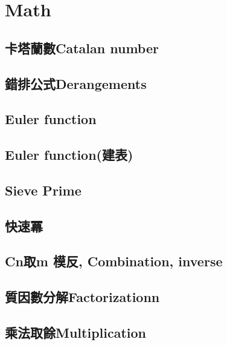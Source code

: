 \section{Math}

\subsection{卡塔蘭數Catalan number}


\subsection{錯排公式Derangements}


\subsection{Euler function}


\subsection{Euler function(建表)}


\subsection{Sieve Prime}


\subsection{快速冪}


\subsection{Cn取m 模反, Combination, inverse}


\subsection{質因數分解Factorizationn}


\subsection{乘法取餘Multiplication}


